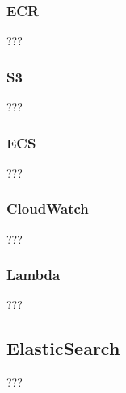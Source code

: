 \subsubsection {ECR}
???
\subsubsection {S3}
???
\subsubsection {ECS}
???
\subsubsection {CloudWatch}
???
\subsubsection {Lambda}
???
\subsection {ElasticSearch}
???